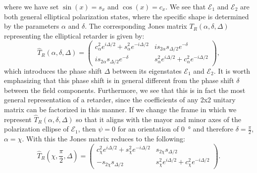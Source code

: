 where we have set $\sin(x) = s_x$ and $\cos(x) = c_x$. We see that $\bm{\mathcal{E}}_1$ and $\bm{\mathcal{E}}_2$ are both general elliptical polarization states, where the specific shape is determined by the parameters $\alpha$ and $\delta$. The corresponding Jones matrix $T_R(\alpha, \delta, \Delta)$ representing the elliptical retarder is given by:
\begin{equation}
    \hat{T}_R(\alpha, \delta, \Delta) = 
    \begin{pmatrix} 
    c^2_{\alpha}  e^{i\Delta /2} + s^2_{\alpha} e^{-i\Delta /2} & i s_{2\alpha} s_{\Delta/2} e^{-\delta} \\ 
    i s_{2\alpha} s_{\Delta/2} e^{-\delta} & s^2_{\alpha} e^{i\Delta/2} + c^2_{\alpha} e^{-i\Delta /2}
    \end{pmatrix}, 
\end{equation}
which introduces the phase shift $\Delta$ between its eigenstates $\bm{\mathcal{E}}_1$ and $\bm{\mathcal{E}}_2$. It is worth emphasizing that this phase shift is in general different from the phase shift $\delta$ between the field components. Furthermore, we see that this is in fact the most general representation of a retarder, since the coefficients of any 2x2 unitary matrix can be factorized in this manner. If we change the frame in which we represent $\hat{T}_R(\alpha, \delta, \Delta)$ so that it aligns with the mayor and minor axes of the polarization ellipse of $\bm{\mathcal{E}}_1$, then $\psi=0$ for an orientation of \SI{0}{\degree} and therefore $\delta=\frac{\pi}{2}$, $\alpha=\chi$. With this the Jones matrix reduces to the following:
\begin{equation}
    \hat{T}_R\left(\chi, \frac{\pi}{2}, \Delta\right) = 
    \begin{pmatrix} 
    c^2_{\chi} e^{i\Delta /2} + s^2_{\chi} e^{-i\Delta /2} & s_{2\chi} s_{\Delta/2} \\
    -s_{2\chi} s_{\Delta/2} & s^2_{\chi} e^{i\Delta /2} + c^2_{\chi} e^{-i\Delta /2}
    \end{pmatrix}. 
\end{equation}

